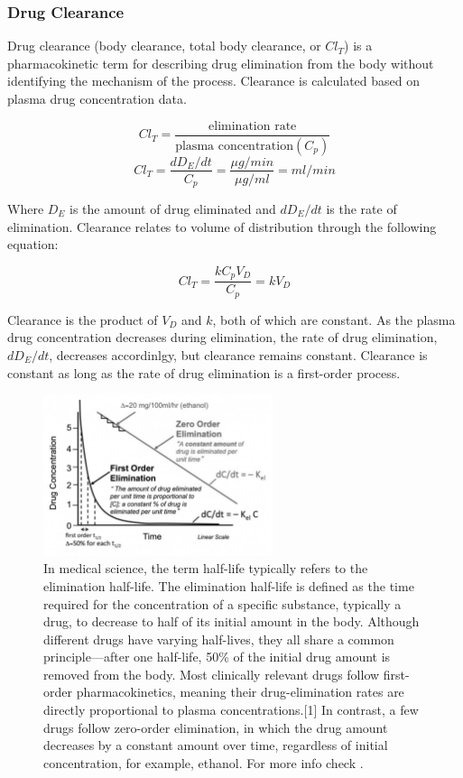 \documentclass{book}
\begin{document}
\subsubsection{Drug Clearance}

Drug clearance (body clearance, total body clearance, or $Cl_T$) is a pharmacokinetic term for describing drug elimination from the body without identifying the mechanism of the process.
Clearance is calculated based on plasma drug concentration data.

\begin{equation*}
    Cl_T = \frac{\text{elimination rate}}{ \text{plasma concentration} (C_p)}
\end{equation*}
\begin{equation*}
    Cl_T = \frac{dD_E / dt}{C_p} = \frac{\mu g / min}{\mu g /ml} = ml/min
\end{equation*}

Where $D_E$ is the amount of drug eliminated and $dD_E / dt$ is the rate of elimination.
Clearance relates to volume of distribution through the following equation:

\begin{equation*}
    Cl_T = \frac{kC_pV_D}{C_p} = k V_D
\end{equation*}

Clearance is the product of $V_D$ and $k$, both of which are constant.
As the plasma drug concentration decreases during elimination, the rate of drug elimination, $dD_E / dt$, decreases accordinlgy, but clearance remains constant.
Clearance is constant as long as the rate of drug elimination is a first-order process.

\begin{figure}
    \includegraphics[width=0.6\textwidth, center]{images/image9.png}

    \caption{In medical science, the term half-life typically refers to the elimination half-life. The elimination half-life is defined as the time required for the concentration of a specific substance, typically a drug, to decrease to half of its initial amount in the body. Although different drugs have varying half-lives, they all share a common principle—after one half-life, 50\% of the initial drug amount is removed from the body. Most clinically relevant drugs follow first-order pharmacokinetics, meaning their drug-elimination rates are directly proportional to plasma concentrations.[1] In contrast, a few drugs follow zero-order elimination, in which the drug amount decreases by a constant amount over time, regardless of initial concentration, for example, ethanol. For more info check \cite{NIH_halflife}.}
\end{figure}
\end{document}
